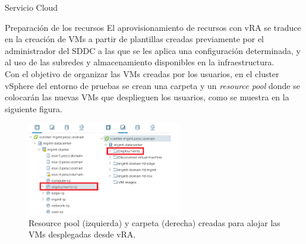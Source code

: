 \begin{subsection}{Servicio Cloud}
\label{subsec:plataforma-cloud}
    

    \begin{subsubsection}{Preparación de los recursos}
    El aprovisionamiento de recursos con vRA se traduce en la creación de VMs a partir de plantillas creadas previamente por el administrador del SDDC a las que se les aplica una configuración determinada, y al uso de las subredes y almacenamiento disponibles en la infraestructura. 
    \\
    Con el objetivo de organizar las VMs creadas por los usuarios, en el cluster vSphere del entorno de pruebas se crean una carpeta y un \textit{resource pool} donde se colocarán las nuevas VMs que desplieguen los usuarios, como se muestra en la siguiente figura.
    \begin{figure}[h]
        \centering
        \includegraphics[width=0.6\textwidth]{imaxes/pruebaconcepto/vrealize/rp-vra.png}
        \caption{Resource pool (izquierda) y carpeta (derecha) creadas para alojar las VMs desplegadas desde vRA.}
        \label{fig:rp-folder-vra}
    \end{figure}
    \FloatBarrier

\end{subsubsection}
\end{subsection}
